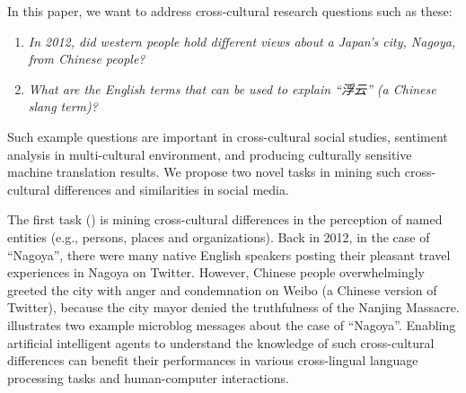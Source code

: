 In this paper,  we want to address cross-cultural research questions such as these:
\vspace{5pt}
\begin{enumerate}
\item {\em In 2012, did western people hold different views about a Japan's city, Nagoya, from Chinese people?}
\item {\em What are the English terms that can be used to explain ``浮云'' (a Chinese slang term)?}
\end{enumerate}
\vspace{5pt}
Such example questions are important in cross-cultural social studies, sentiment analysis in multi-cultural environment, and producing culturally sensitive machine translation results. 
We propose two novel tasks in mining such cross-cultural differences and similarities in social media.

The first task () is mining cross-cultural differences in
the perception of named entities (e.g., persons, places and organizations). 
Back in 2012, in the case of ``Nagoya'', there were many native English speakers posting their pleasant travel experiences in Nagoya on Twitter.
However, Chinese people overwhelmingly greeted the city with anger and 
condemnation on Weibo (a Chinese version of Twitter), because the city mayor denied the truthfulness of the Nanjing Massacre.
 illustrates two example microblog messages about the case of ``Nagoya''.
Enabling artificial intelligent agents to understand the knowledge of such cross-cultural differences can benefit their performances in various
cross-lingual language processing tasks and human-computer interactions.


